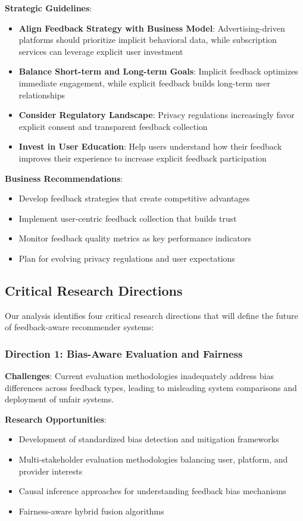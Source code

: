 \textbf{Strategic Guidelines}:
\begin{itemize}
    \item \textbf{Align Feedback Strategy with Business Model}: Advertising-driven platforms should prioritize implicit behavioral data, while subscription services can leverage explicit user investment
    \item \textbf{Balance Short-term and Long-term Goals}: Implicit feedback optimizes immediate engagement, while explicit feedback builds long-term user relationships
    \item \textbf{Consider Regulatory Landscape}: Privacy regulations increasingly favor explicit consent and transparent feedback collection
    \item \textbf{Invest in User Education}: Help users understand how their feedback improves their experience to increase explicit feedback participation
\end{itemize}

\textbf{Business Recommendations}:
\begin{itemize}
    \item Develop feedback strategies that create competitive advantages
    \item Implement user-centric feedback collection that builds trust
    \item Monitor feedback quality metrics as key performance indicators
    \item Plan for evolving privacy regulations and user expectations
\end{itemize}

\subsection{Critical Research Directions}

Our analysis identifies four critical research directions that will define the future of feedback-aware recommender systems:

\subsubsection{Direction 1: Bias-Aware Evaluation and Fairness}

\textbf{Challenges}:
Current evaluation methodologies inadequately address bias differences across feedback types, leading to misleading system comparisons and deployment of unfair systems.

\textbf{Research Opportunities}:
\begin{itemize}
    \item Development of standardized bias detection and mitigation frameworks
    \item Multi-stakeholder evaluation methodologies balancing user, platform, and provider interests
    \item Causal inference approaches for understanding feedback bias mechanisms
    \item Fairness-aware hybrid fusion algorithms
\end{itemize}


